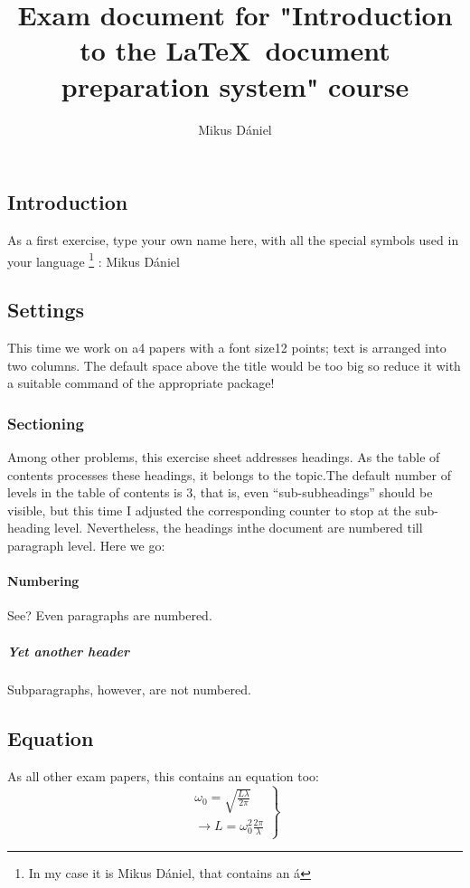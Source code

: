 \documentclass[12pt]{article}
\title{Exam document for "Introduction to the \LaTeX ~document preparation system" course}
\author{Mikus Dániel}
\begin{document}
\maketitle
\begin{multicols}{2}
\section{Introduction}
As a first exercise, type your own name here, with all the special symbols used in your language \footnote{In my case it is Mikus Dániel, that contains an á} : Mikus Dániel
\subsection{Settings}
This time we work on a4 papers with a font size12 points; text is arranged into two columns. The default space above the title would be too big so reduce it with a suitable command of the appropriate package!
\subsubsection{Sectioning}
Among other problems, this exercise sheet addresses headings. As the table of contents processes these headings, it belongs to the topic.The default number of levels in the table of contents is 3, that is, even “sub-subheadings” should be visible, but this time I adjusted the corresponding counter to stop at the sub-heading level.  Nevertheless, the headings inthe document are numbered till paragraph level. Here we go:
\paragraph{Numbering}
See? Even paragraphs are numbered. 
\subparagraph{Yet another header}
Subparagraphs, however, are not numbered. 
\columnbreak
\subsection{Equation}
As all other exam papers, this contains an equation too:
\begin{equation}
\left.
\begin{array}{c}
   \omega _0 = \sqrt{\frac{L \lambda}{2 \pi}} \\
    \to L = \omega _0^2 \frac{2 \pi}{\lambda}
\end{array}
\right\}
\end{equation}
\tableofcontents
\end{multicols}
\end{document}
